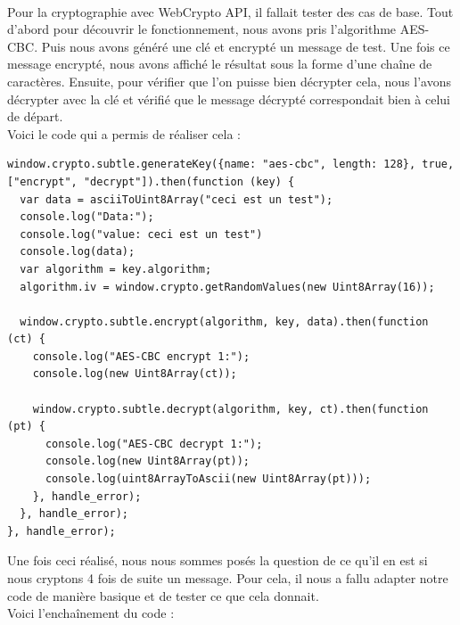 \documentclass[a4paper,12pt]{report}
\begin{document}
	\paragraph*{}
	Pour la cryptographie avec WebCrypto API, il fallait tester des cas de base. Tout d'abord pour découvrir le fonctionnement, nous avons pris l'algorithme AES-CBC. Puis nous avons généré une clé et encrypté un message de test. Une fois ce message encrypté, nous avons affiché le résultat sous la forme d'une cha\^ine de caractères. Ensuite, pour vérifier que l'on puisse bien décrypter cela, nous l'avons décrypter avec la clé et vérifié que le message décrypté correspondait bien à celui de départ.\\
	Voici le code qui a permis de réaliser cela :
	\begin{lstlisting}
window.crypto.subtle.generateKey({name: "aes-cbc", length: 128}, true, ["encrypt", "decrypt"]).then(function (key) {
  var data = asciiToUint8Array("ceci est un test");
  console.log("Data:");
  console.log("value: ceci est un test")
  console.log(data);
  var algorithm = key.algorithm;
  algorithm.iv = window.crypto.getRandomValues(new Uint8Array(16));

  window.crypto.subtle.encrypt(algorithm, key, data).then(function (ct) {
    console.log("AES-CBC encrypt 1:");
    console.log(new Uint8Array(ct));

    window.crypto.subtle.decrypt(algorithm, key, ct).then(function (pt) {
      console.log("AES-CBC decrypt 1:");
      console.log(new Uint8Array(pt));
      console.log(uint8ArrayToAscii(new Uint8Array(pt)));
    }, handle_error);
  }, handle_error);
}, handle_error);
	\end{lstlisting}
	Une fois ceci réalisé, nous nous sommes posés la question de ce qu'il en est si nous cryptons 4 fois de suite un message. Pour cela, il nous a fallu adapter notre code de manière basique et de tester ce que cela donnait.\\
	Voici l'encha\^inement du code : 
\end{document}
